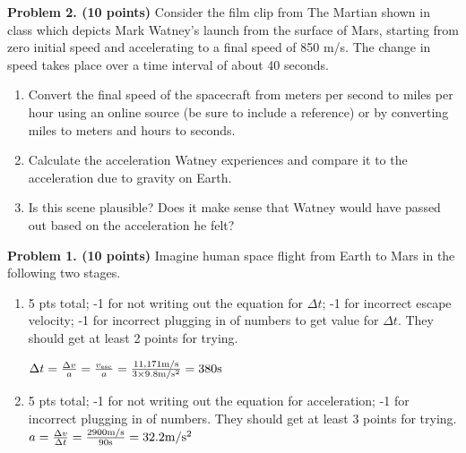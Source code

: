 \documentclass[12pt]{article}
\begin{document}
\vspace{1cm}

\noindent


\vspace{0.5cm}

\noindent
\textbf{Problem 2. (10 points)} Consider the film clip from The Martian shown in
class which depicts Mark Watney's launch from the surface of Mars, starting from
zero initial speed and accelerating to a final speed of 850 m/s. The change in
speed takes place over a time interval of about 40 seconds.

\begin{enumerate}
    \item[a.] Convert the final speed of the spacecraft from meters per second
    to miles per hour using an online source (be sure to include a reference) or
    by converting miles to meters and hours to seconds. 
    \item[b.] Calculate the acceleration Watney experiences and compare it to
    the acceleration due to gravity on Earth.
    \item[c.] Is this scene plausible? Does it make sense that Watney would have
    passed out based on the acceleration he felt?
\end{enumerate}

\vspace{0.5cm}

\noindent

\newpage
\vspace{1cm}


\noindent
\textbf{Problem 1. (10 points)} Imagine human space flight from Earth to Mars in
the following two stages.

\begin{enumerate}
    \item[a.] 5 pts total; -1 for not writing out the equation for $\Delta t$;
    -1 for incorrect escape velocity; -1 for incorrect plugging in of numbers to
    get value for $\Delta t$. They should get at least 2 points for trying.

    $\Delta t = \frac{\Delta v }{a} = \frac{v_{\rm{esc}}}{a} = \frac{11,171\rm{m/s}}{3\times9.8\rm{m/s^2}} = 380 \rm{s}$
    
    \item[b.] 5 pts total; -1 for not writing out the equation for acceleration;
    -1 for incorrect plugging in of numbers. They should get at least 3 points
    for trying. 
    $a = \frac{\Delta v}{\Delta t} = \frac{2900\rm{m/s}}{90\rm{s}} = 32.2 \rm{m/s^2}$

\end{enumerate}
\end{document}
